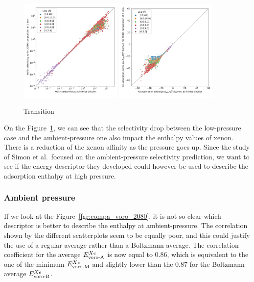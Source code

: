 \documentclass[main]{subfiles}
\begin{document}
\begin{figure}[ht]
  \centering
  \includegraphics[width=0.45\textwidth]{figures/3-fastsim/s_0_vs_s_2080_overview.jpg}
  \includegraphics[width=0.45\textwidth]{figures/3-fastsim/H_Xe_0_vs_H_Xe_2080_overview.jpg}
    \caption{Transition}\label{fgr:compa_pressure}
\end{figure}

On the Figure~\ref{fgr:compa_pressure}, we can see that the selectivity drop between the low-pressure case and the ambient-pressure one also impact the enthalpy values of xenon. There is a reduction of the xenon affinity as the pressure goes up. Since the study of Simon et al.\ focused on the ambient-pressure selectivity prediction, we want to see if the energy descriptor they developed could however be used to describe the adsorption enthalpy at high pressure. 

\subsubsection{Ambient pressure}

If we look at the Figure~\ref{fgr:compa_voro_2080}, it is not so clear which descriptor is better to describe the enthalpy at ambient-pressure. The correlation shown by the different scatterplots seem to be equally poor, and this could justify the use of a regular average rather than a Boltzmann average. The correlation coefficient for the average $E_{\text{voro-A}}^{Xe}$ is now equal to $0.86$, which is equivalent to the one of the minimum $E_{\text{voro-M}}^{Xe}$ and slightly lower than the $0.87$ for the Boltzmann average $E_{\text{voro-B}}^{Xe}$. 
\end{document}

